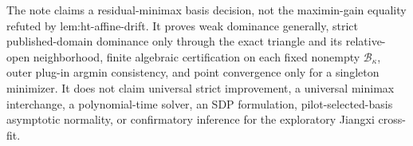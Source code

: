 The note claims a residual-minimax basis decision, not the maximin-gain equality refuted by lem:ht-affine-drift.  It proves weak dominance generally, strict published-domain dominance only through the exact triangle and its relative-open neighborhood, finite algebraic certification on each fixed nonempty \(\mathcal B_\kappa\), outer plug-in argmin consistency, and point convergence only for a singleton minimizer.  It does not claim universal strict improvement, a universal minimax interchange, a polynomial-time solver, an SDP formulation, pilot-selected-basis asymptotic normality, or confirmatory inference for the exploratory Jiangxi cross-fit.